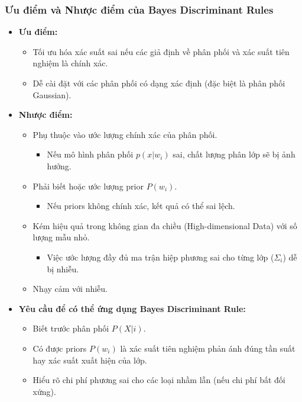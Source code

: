 \documentclass[
  a4paper,
]{article}
\providecommand{\tightlist}{%
  \setlength{\itemsep}{0pt}\setlength{\parskip}{0pt}}
\begin{document}
\subsubsection{Ưu điểm và Nhược điểm của Bayes Discriminant
Rules}\label{ux1b0u-ux111iux1ec3m-vuxe0-nhux1b0ux1ee3c-ux111iux1ec3m-cux1ee7a-bayes-discriminant-rules}

\begin{itemize}
\tightlist
\item
  \textbf{Ưu điểm:}

  \begin{itemize}
  \tightlist
  \item
    Tối ưu hóa xác suất sai nếu các giả định về phân phối và xác suất
    tiên nghiệm là chính xác.
  \item
    Dễ cài đặt với các phân phối có dạng xác định (đặc biệt là phân phối
    Gaussian).
  \end{itemize}
\item
  \textbf{Nhược điểm:}

  \begin{itemize}
  \tightlist
  \item
    Phụ thuộc vào ước lượng chính xác của phân phối.

    \begin{itemize}
    \tightlist
    \item
      Nếu mô hình phân phối \(p(x|w_i)\) sai, chất lượng phân lớp sẽ bị
      ảnh hưởng.
    \end{itemize}
  \item
    Phải biết hoặc ước lượng prior \(P(w_i)\).

    \begin{itemize}
    \tightlist
    \item
      Nếu priors không chính xác, kết quả có thể sai lệch.
    \end{itemize}
  \item
    Kém hiệu quả trong không gian đa chiều (High-dimensional Data) với
    số lượng mẫu nhỏ.

    \begin{itemize}
    \tightlist
    \item
      Việc ước lượng đầy đủ ma trận hiệp phương sai cho từng lớp
      (\(\Sigma_i\)) dễ bị nhiễu.
    \end{itemize}
  \item
    Nhạy cảm với nhiễu.
  \end{itemize}
\item
  \textbf{Yêu cầu để có thể ứng dụng Bayes Discriminant Rule:}

  \begin{itemize}
  \tightlist
  \item
    Biết trước phân phối \(P(X|i)\).
  \item
    Có được priors \(P(w_i)\) là xác suất tiên nghiệm phản ánh đúng tần
    suất hay xác suất xuất hiện của lớp.
  \item
    Hiểu rõ chi phí phương sai cho các loại nhầm lẫn (nếu chi phí bất
    đối xứng).
  \end{itemize}
\end{itemize}
\end{document}

